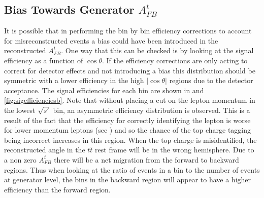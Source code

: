 \subsection{Bias Towards Generator $A_{FB}^t$}

It is possible that in performing the bin by bin efficiency corrections to account for misreconstructed events a bias could have been introduced in the reconstructed $A_{FB}^t$. One way that this can be checked is by looking at the signal efficiency as a function of $\cos\theta$. If the efficiency corrections are only acting to correct for detector effects and not introducing a bias this distribution should be symmetric with a lower efficiency in the high $|\cos\theta|$ regions due to the detector acceptance. The signal efficiencies for each bin are shown in  and \ref{fig:sigefficienciesb}. Note that without placing a cut on the lepton momentum in the lowest $\sqrt{s'}$ bin, an asymmetric efficiency distribution is observed. This is a result of the fact that the efficiency for correctly identifying the lepton is worse for lower momentum leptons (see ) and so the chance of the top charge tagging being incorrect increases in this region. When the top charge is misidentified, the reconstructed angle in the $t\bar{t}$ rest frame will be in the wrong hemisphere. Due to a non zero $A_{FB}^t$ there will be a net migration from the forward to backward regions. Thus when looking at the ratio of events in a bin to the number of events at generator level, the bins in the backward region will appear to have a higher efficiency than the forward region.

